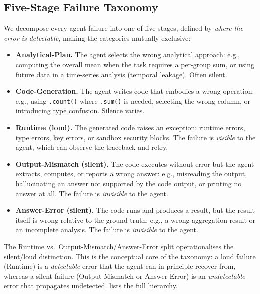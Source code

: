 \subsection{Five-Stage Failure Taxonomy}
\label{sec:taxonomy}

We decompose every agent failure into one of five stages, defined by \emph{where the error is detectable}, making the categories mutually exclusive:

\begin{itemize}[leftmargin=*,itemsep=2pt]
\item \textbf{Analytical-Plan.} The agent selects the wrong analytical approach: e.g., computing the overall mean when the task requires a per-group sum, or using future data in a time-series analysis (temporal leakage). Often silent.
\item \textbf{Code-Generation.} The agent writes code that embodies a wrong operation: e.g., using \texttt{.count()} where \texttt{.sum()} is needed, selecting the wrong column, or introducing type confusion. Silence varies.
\item \textbf{Runtime (loud).} The generated code raises an exception: runtime errors, type errors, key errors, or sandbox security blocks. The failure is \emph{visible} to the agent, which can observe the traceback and retry.
\item \textbf{Output-Mismatch (silent).} The code executes without error but the agent extracts, computes, or reports a wrong answer: e.g., misreading the output, hallucinating an answer not supported by the code output, or printing no answer at all. The failure is \emph{invisible} to the agent.
\item \textbf{Answer-Error (silent).} The code runs and produces a result, but the result itself is wrong relative to the ground truth: e.g., a wrong aggregation result or an incomplete analysis. The failure is \emph{invisible} to the agent.
\end{itemize}

The Runtime vs.\ Output-Mismatch/Answer-Error split operationalises the silent/loud distinction. This is the conceptual core of the taxonomy: a loud failure (Runtime) is a \emph{detectable} error that the agent can in principle recover from, whereas a silent failure (Output-Mismatch or Answer-Error) is an \emph{undetectable} error that propagates undetected.  lists the full hierarchy.

